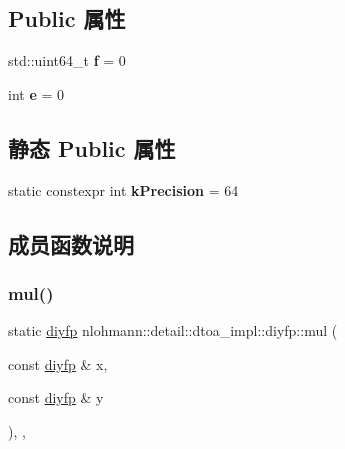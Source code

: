 \subsection*{Public 属性}
\begin{DoxyCompactItemize}
\item 
\mbox{\label{structnlohmann_1_1detail_1_1dtoa__impl_1_1diyfp_aea90459e340a231ca31d46946803ef51}} 
std\+::uint64\+\_\+t {\bfseries f} = 0
\item 
\mbox{\label{structnlohmann_1_1detail_1_1dtoa__impl_1_1diyfp_ae22e170815983961447c429f324c944d}} 
int {\bfseries e} = 0
\end{DoxyCompactItemize}
\subsection*{静态 Public 属性}
\begin{DoxyCompactItemize}
\item 
\mbox{\label{structnlohmann_1_1detail_1_1dtoa__impl_1_1diyfp_a03682754b06ed4f30b263119eecc2d52}} 
static constexpr int {\bfseries k\+Precision} = 64
\end{DoxyCompactItemize}


\subsection{成员函数说明}
\mbox{\label{structnlohmann_1_1detail_1_1dtoa__impl_1_1diyfp_aa5f250d12ce89c81fdb08900c6a823e8}} 
\subsubsection{\texorpdfstring{mul()}{mul()}}
{\footnotesize\ttfamily static \mbox{\hyperlink{structnlohmann_1_1detail_1_1dtoa__impl_1_1diyfp}{diyfp}} nlohmann\+::detail\+::dtoa\+\_\+impl\+::diyfp\+::mul (\begin{DoxyParamCaption}\item[{const \mbox{\hyperlink{structnlohmann_1_1detail_1_1dtoa__impl_1_1diyfp}{diyfp}} \&}]{x,  }\item[{const \mbox{\hyperlink{structnlohmann_1_1detail_1_1dtoa__impl_1_1diyfp}{diyfp}} \&}]{y }\end{DoxyParamCaption})\hspace{0.3cm}{\ttfamily [inline]}, {\ttfamily [static]}, {\ttfamily [noexcept]}}



